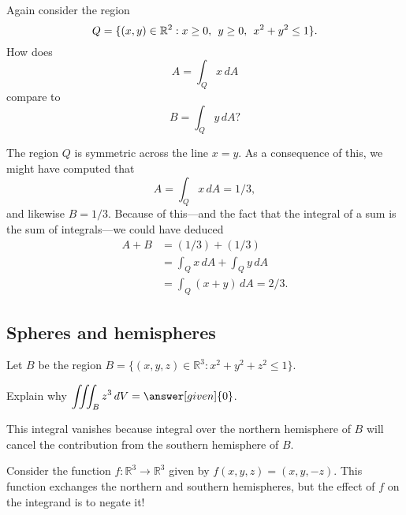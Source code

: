 \documentclass{ximera}
\begin{document}
\begin{question}
  Again consider the region
  \[
    Q = \{ (x,y) \in \mathbb R^2 : x \geq 0,\hspace{1ex} y \geq 0,\hspace{1ex} x^2 + y^2 \leq 1 \}.
  \]
  How does
  \[
    A = \int_Q x \, dA  
  \]
  compare to 
  \[
    B = \int_Q y \, dA?
  \]

  \begin{multipleChoice}
  \end{multipleChoice}

  \begin{feedback}[correct]
    The region $Q$ is symmetric across the line $x = y$.  As a consequence of this, we might have computed that
    \[
      A = \int_Q x \, dA = 1/3,
    \]
    and likewise $B = 1/3$.  Because of this---and the fact that the integral of a sum is the sum of integrals---we could have deduced
    \begin{align*}
      A + B &= (1/3) + (1/3) \\
            &= \int_Q x \, dA + \int_Q y \, dA \\
            &= \int_Q (x+y) \, dA = 2/3.
    \end{align*}
  \end{feedback}
\end{question}

\subsection{Spheres and hemispheres}

\begin{example}
  Let $B$ be the region $B = \{ (x,y,z) \in \mathbb{R}^3 : x^2 + y^2 + z^2 \leq 1\}$.

  Explain why $\displaystyle\iiint_B z^3 \, dV = \answer[given]{0}$.

  \begin{explanation}
    This integral vanishes because integral over the northern
    hemisphere of $B$ will cancel the contribution from the southern
    hemisphere of $B$.

    Consider the function $f : \mathbb{R}^3 \to \mathbb{R}^3$ given by
    $f(x,y,z) = (x,y,-z)$.  This function exchanges the northern and
    southern hemispheres, but the effect of $f$ on the integrand is to
    negate it!
  \end{explanation}
\end{example}
\end{document}
